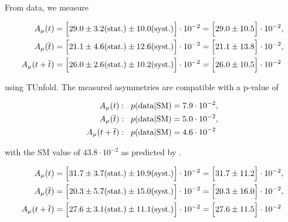 \newcommand{\AlResultCombined}{\ensuremath{\Big[26.0\pm 10.5 \Big]\cdot 10^{-2}}\xspace}
\newcommand{\AlResultCombinedStatSys}{\ensuremath{\Big[26.0\pm 2.6 \mathrm{(stat.)}\pm 10.2\mathrm{(syst.)} \Big] \cdot 10^{-2}} \xspace}
\newcommand{\AlResultCombinedPvalue}{\ensuremath{4.6\cdot 10^{-2}}\xspace}

\newcommand{\AlResultTop}{\ensuremath{\Big[29.0\pm 10.5 \Big]\cdot 10^{-2}}\xspace}
\newcommand{\AlResultTopStatSys}{\ensuremath{\Big[29.0 \pm 3.2 \mathrm{(stat.)} \pm 10.0\mathrm{(syst.)} \Big]\cdot 10^{-2}}\xspace}
\newcommand{\AlResultTopPvalue}{\ensuremath{7.9\cdot 10^{-2}}\xspace}

\newcommand{\AlResultAntiTop}{\ensuremath{\Big[21.1\pm 13.8 \Big]\cdot 10^{-2}}\xspace}
\newcommand{\AlResultAntiTopStatSys}{\ensuremath{\Big[21.1\pm 4.6\mathrm{(stat.)}\pm 12.6\mathrm{(syst.)} \Big]\cdot 10^{-2}}\xspace}
\newcommand{\AlResultAntiTopPvalue}{\ensuremath{5.0\cdot 10^{-2}}\xspace}


From data, we measure

\begin{align}
\AmuT          & = \AlResultTopStatSys = \AlResultTop , \\
\AmuTbar       & = \AlResultAntiTopStatSys = \AlResultAntiTop , \\
\AmuTplusTbar & = \AlResultCombinedStatSys = \AlResultCombined
\end{align}

using TUnfold. The measured asymmetries are compatible with a p-value of

\begin{align}
\AmuT:&\hspace{0.3cm} p(\mathrm{data |SM})          = \AlResultTopPvalue , \\
\AmuTbar:&\hspace{0.3cm} p(\mathrm{data |SM})      = \AlResultAntiTopPvalue , \\
\AmuTplusTbar:&\hspace{0.3cm} p(\mathrm{data |SM}) = \AlResultCombinedPvalue
\end{align}

with the SM value of $43.8\cdot 10^{-2}$ as predicted by \POWHEG.



\begin{align}
\AmuT          & = \Big[31.7\pm 3.7 \mathrm{(stat.)}\pm 10.9\mathrm{(syst.)} \Big]\cdot 10^{-2} = \Big[31.7\pm 11.2 \Big]\cdot 10^{-2} , \\
\AmuTbar       & = \Big[20.3\pm 5.7 \mathrm{(stat.)}\pm 15.0\mathrm{(syst.)} \Big]\cdot 10^{-2} = \Big[20.3\pm 16.0 \Big]\cdot 10^{-2} , \\
\AmuTplusTbar & = \Big[27.6\pm 3.1 \mathrm{(stat.)}\pm 11.1\mathrm{(syst.)} \Big]\cdot 10^{-2} = \Big[27.6\pm 11.5 \Big]\cdot 10^{-2} 
\end{align}

